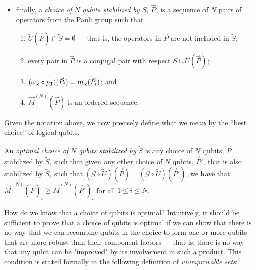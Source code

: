 \documentclass[twocolumn,showpacs,preprintnumbers,amsmath,amssymb,nofootinbib,pra,floatfix]{revtex4-1}
\newenvironment{definition}[1][Definition]{\begin{trivlist}
\item[\hskip \labelsep {\bfseries #1}]}{\end{trivlist}}
\newcommand{\lst}{\vec}
\newcommand{\set}{\tilde}
\newcommand{\genfun}{\mathcal{G}}
\begin{document}
\begin{definition}
\begin{itemize}
\item finally, a \emph{choice of $N$ qubits stabilized by $\set S$}, $\lst P$, is a sequence of $N$ pairs of operators from the Pauli group such that 
\begin{enumerate}
\item $\set U(\lst P)\cap \set S = \emptyset$ --- that is, the operators in $\lst P$ are not included in $\set S$;
\item every pair in $\lst P$ is a conjugal pair with respect $\set S \cup \set U(\lst P)$;
\item $(\om_{\set S}\circ p_1)(\lst P_i)=m_{\set S}(\lst P_i)$; and
\item $\lst M^{(N)}(\lst P)$ is an ordered sequence.
\end{enumerate}
\end{itemize}

\end{definition}
Given the notation above, we now precisely define what we mean by the ``best choice'' of logical qubits.

\begin{definition}
An \emph{optimal choice of $N$ qubits stabilized by $\set S$} is any choice of $N$ qubits, $\lst P$ stabilized by $\set S$, such that given any other choice of $N$ qubits, $\lst P'$, that is also stabilized by $\set S$, such that $(\genfun\circ \set U)(\lst P)=(\genfun\circ \set U)(\lst P')$, we have that $\lst M^{(N)}(\lst P)_i \ge \lst M^{(N)}(\lst P')_i$ for all $1\le i \le N$.
\end{definition}
How do we know that a choice of qubits is optimal?  Intuitively, it should be sufficient to prove that a choice of qubits is optimal if we can show that there is no way that we can recombine qubits in the choice to form one or more qubits that are more robust than their component factors --- that is, there is no way that any qubit can be "improved" by its involvement in such a product.  This condition is stated formally in the following definition of \emph{unimprovable sets}:
\end{document}
